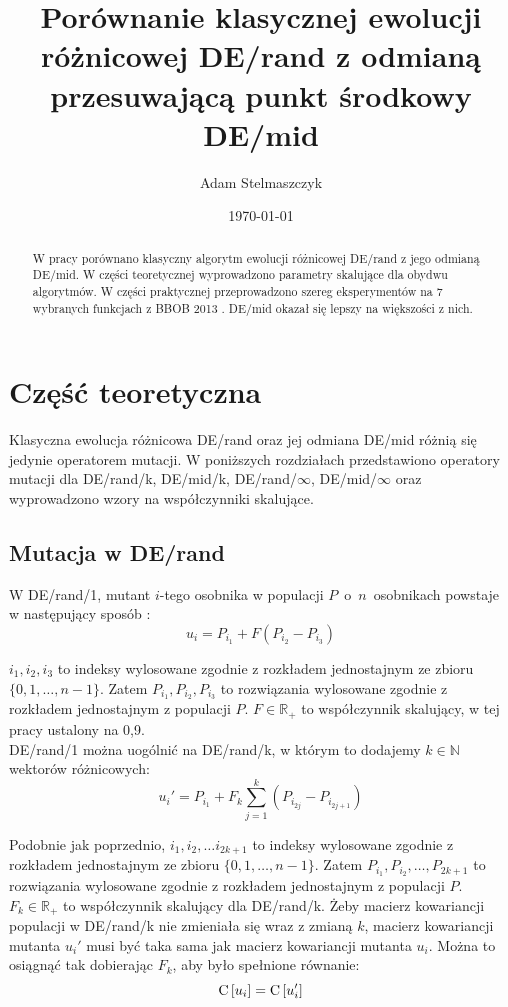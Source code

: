 \documentclass[12pt, a4paper]{article}
\title{\textbf{Porównanie klasycznej ewolucji różnicowej DE/rand z odmianą przesuwającą punkt środkowy DE/mid}}
\author{Adam Stelmaszczyk}
\date{\today}
\def\C{{\rm C}\,}
\begin{document}
\maketitle

\begin{abstract}
W pracy porównano klasyczny algorytm ewolucji różnicowej DE/rand z jego odmianą DE/mid.
W części teoretycznej wyprowadzono parametry skalujące dla obydwu algorytmów. W części praktycznej
przeprowadzono szereg eksperymentów na 7 wybranych funkcjach z BBOB 2013 \cite{hansen}. DE/mid
okazał się lepszy na większości z nich.
\end{abstract}

\section{Część teoretyczna}

Klasyczna ewolucja różnicowa DE/rand oraz jej odmiana DE/mid różnią się jedynie operatorem mutacji.
W poniższych rozdziałach przedstawiono operatory mutacji dla DE/rand/k, DE/mid/k, DE/rand/$\infty$, DE/mid/$\infty$
oraz wyprowadzono wzory na współczynniki skalujące.

\subsection{Mutacja w DE/rand}

W DE/rand/1, mutant $i$-tego osobnika w populacji $P$~o~$n$~osobnikach powstaje w następujący sposób \cite{opara}:
\begin{equation} \label{eq:derand1}
u_i = P_{i_1} + F(P_{i_2} - P_{i_3})
\end{equation}

$i_1, i_2, i_3$ to indeksy wylosowane zgodnie z rozkładem jednostajnym ze zbioru \\ 
$\{0, 1, \dots, n-1\}$. Zatem $P_{i_1}, P_{i_2}, P_{i_3}$ to rozwiązania wylosowane zgodnie z rozkładem jednostajnym z populacji $P$.
$F\in\mathbb{R_+}$ to współczynnik skalujący, w tej pracy ustalony na 0,9. \\

DE/rand/1 można uogólnić na DE/rand/k, w którym to dodajemy
$k \in \mathbb{N}$ wektorów różnicowych:
\begin{equation} \label{eq:derand}
u_i' = P_{i_1} + F_k\sum\limits_{j=1}^k (P_{i_{2j}} - P_{i_{2j+1}})
\end{equation}

Podobnie jak poprzednio, $i_1, i_2, \dots i_{2k+1}$ to indeksy wylosowane zgodnie z rozkładem jednostajnym ze zbioru 
$\{0, 1, \dots, n-1\}$. Zatem $P_{i_1}, P_{i_2}, \dots, P_{2k+1}$ to rozwiązania wylosowane zgodnie z rozkładem 
jednostajnym z populacji $P$. $F_k\in\mathbb{R_+}$ to współczynnik skalujący dla DE/rand/k. 
Żeby macierz kowariancji populacji w DE/rand/k nie zmieniała się wraz z zmianą $k$, 
macierz kowariancji mutanta $u_i'$ musi być taka sama jak macierz kowariancji mutanta $u_i$.
Można to osiągnąć tak dobierając $F_k$, aby było spełnione równanie:
\begin{equation} \label{eq:kowariancje}
\C[u_i] = \C[u_i']
\end{equation}
\end{document}

